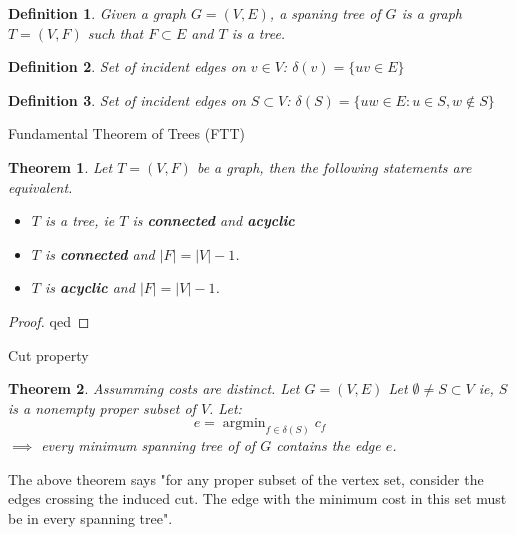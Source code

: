 \documentclass{article}
\newtheorem{definition}{Definition}
\newtheorem{theorem}{Theorem}
\DeclareMathOperator*{\argmin}{argmin} %
\begin{document}
\begin{definition}
    Given a graph $G=(V,E)$, a spaning tree of $G$ is a graph $T=(V,F)$ such that $F \subset E$ and $T$ is a tree.
\end{definition}

\begin{definition}
    Set of incident edges on $v \in V$: $\delta(v) = \{ uv \in E \}$
\end{definition}

\begin{definition}
    Set of incident edges on $S \subset V$: $\delta(S) = \{ uw \in E  : u \in S, w \not\in S\}$
\end{definition}


\begin{greenbox}{Fundamental Theorem of Trees (FTT)}
\begin{theorem}
Let $T=(V,F)$ be a graph, then the following statements are equivalent.
\begin{itemize}
    \item $T$ is a tree, ie $T$ is \textbf{connected} and \textbf{acyclic}
    \item $T$ is \textbf{connected} and $|F| = |V| - 1$.
    \item $T$ is \textbf{acyclic} and $|F| = |V| - 1$.
\end{itemize}
\end{theorem}
\end{greenbox}

\begin{proof}
    qed
\end{proof}

\begin{greenbox}{Cut property}
\begin{theorem}
\textit{Assumming costs are distinct}.
Let $G=(V,E)$
Let $\emptyset \neq S\subset V$ ie, $S$ is a nonempty proper subset of $V$.
Let: 
\[ e = \argmin_{f \in \delta(S)} c_f \]
$\implies$ every minimum spanning tree of of $G$ contains the edge $e$.
\end{theorem}
\end{greenbox}
The above theorem says "for any proper subset of the vertex set, consider the edges crossing the induced cut. The edge with the minimum cost in this set must be in every spanning tree".
\end{document}
